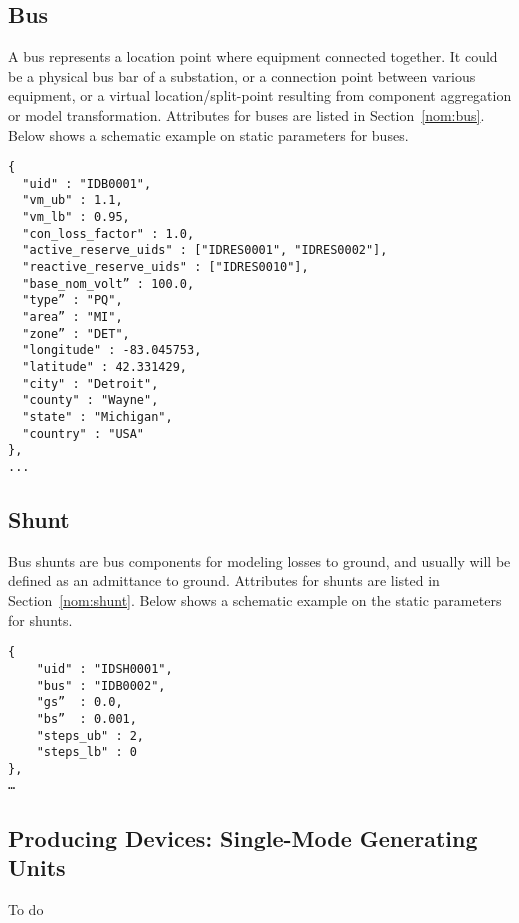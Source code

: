 \subsection{Bus}
\label{sec:bus}
A bus represents a location point where equipment connected together.
It could be a physical bus bar of a substation, or 
a connection point between various equipment, 
or a virtual location/split-point resulting from
component aggregation or model transformation.
Attributes for buses are listed in Section~\ref{nom:bus}.
Below shows a schematic example on static parameters for buses.
\begin{verbatim}
{
  "uid" : "IDB0001",
  "vm_ub" : 1.1,
  "vm_lb" : 0.95,
  "con_loss_factor" : 1.0,
  "active_reserve_uids" : ["IDRES0001", "IDRES0002"],
  "reactive_reserve_uids" : ["IDRES0010"],
  "base_nom_volt” : 100.0,
  "type” : "PQ",
  "area” : "MI",
  "zone” : "DET",
  "longitude" : -83.045753,
  "latitude" : 42.331429,
  "city" : "Detroit",
  "county" : "Wayne",
  "state" : "Michigan",
  "country" : "USA"
},
...
\end{verbatim}


\subsection{Shunt}
\label{sec:shunt}
Bus shunts are bus components for modeling losses to ground, and 
usually will be defined as an admittance to ground.
Attributes for shunts are listed in Section~\ref{nom:shunt}.
Below shows a schematic example on the static parameters for shunts.
\begin{verbatim}
{
    "uid" : "IDSH0001",
    "bus" : "IDB0002",
    "gs”  : 0.0,
    "bs”  : 0.001,
    "steps_ub" : 2,
    "steps_lb" : 0
},
…    
\end{verbatim}


\subsection{Producing Devices: Single-Mode Generating Units}
\label{sec:generator}
\begin{todo}[]{}
To do
\end{todo}

